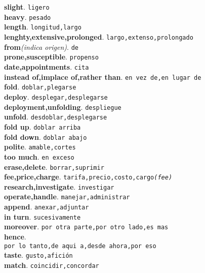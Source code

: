 \documentclass[twocolumn]{article}
\begin{document}
	\textsf{\textbf{slight}}. \texttt{ligero}\\
	\textsf{\textbf{heavy}}. \texttt{pesado}\\
	\textsf{\textbf{length}}. \texttt{longitud,largo}\\
	\textsf{\textbf{lenghty,extensive,prolonged}}. \texttt{largo,extenso,prolongado}\\
	\textsf{\textbf{from}}{\scriptsize \textsl{(indica origen)}}. \texttt{de}\\
	\textsf{\textbf{prone,susceptible}}. \texttt{propenso}\\
	\textsf{\textbf{date,appointments}}. \texttt{cita}\\
	\textsf{\textbf{instead of,implace of,rather than}}. \texttt{en vez de,en lugar de}\\
	\textsf{\textbf{fold}}. \texttt{doblar,plegarse}\\
	\textsf{\textbf{deploy}}. \texttt{desplegar,desplegarse}\\
	\textsf{\textbf{deployment,unfolding}}. \texttt{despliegue}\\
	\textsf{\textbf{unfold}}. \texttt{desdoblar,desplegarse}\\
	\textsf{\textbf{fold up}}. \texttt{doblar arriba}\\
	\textsf{\textbf{fold down}}. \texttt{doblar abajo}\\
	\textsf{\textbf{polite}}. \texttt{amable,cortes}\\
	\textsf{\textbf{too much}}. \texttt{en exceso}\\
	\textsf{\textbf{erase,delete}}. \texttt{borrar,suprimir}\\
	\textsf{\textbf{fee,price,charge}}. \texttt{tarifa,precio,costo,cargo{\scriptsize \textsl{(fee)}}}\\
	\textsf{\textbf{research,investigate}}. \texttt{investigar}\\
	\textsf{\textbf{operate,handle}}. \texttt{manejar,administrar}\\
	\textsf{\textbf{append}}. \texttt{anexar,adjuntar}\\
	\textsf{\textbf{in turn}}. \texttt{sucesivamente}\\
	\textsf{\textbf{moreover}}. \texttt{por otra parte,por otro lado,es mas}\\
	\textsf{\textbf{hence}}.\\\texttt{por lo tanto,de aqui a,desde ahora,por eso}\\
	\textsf{\textbf{taste}}. \texttt{gusto,afici\'on}\\
	\textsf{\textbf{match}}. \texttt{coincidir,concordar}\\
\end{document}
